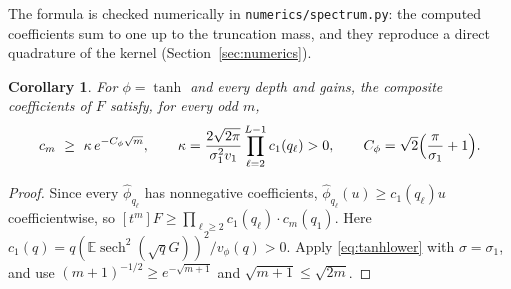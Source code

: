 \documentclass[11pt]{article}
\newtheorem{corollary}[theorem]{Corollary}
\theoremstyle{definition}\newtheorem{assumption}[theorem]{Assumption}
\theoremstyle{remark}\newtheorem{remark}[theorem]{Remark}
\newcommand{\E}{\mathbb E}
\begin{document}
The formula is checked numerically in \texttt{numerics/spectrum.py}: the
computed coefficients sum to one up to the truncation mass, and they
reproduce a direct quadrature of the kernel (Section~\ref{sec:numerics}).

\begin{corollary}\label{cor:composite}
For $\phi=\tanh$ and every depth and gains, the composite coefficients of
$F$ satisfy, for every odd $m$,
\[
 c_m\ \ge\ \kappa\,e^{-C_\phi\sqrt m},\qquad
 \kappa=\frac{2\sqrt{2\pi}}{\sigma_1^2v_1}\prod_{\ell=2}^{L-1}c_1(q_\ell)>0,
 \qquad C_\phi=\sqrt2\Bigl(\frac\pi{\sigma_1}+1\Bigr).
\]
\end{corollary}
\begin{proof}
Since every $\widehat\phi_{q_\ell}$ has nonnegative coefficients,
$\widehat\phi_{q_\ell}(u)\ge c_1(q_\ell)u$ coefficientwise, so
$[t^m]F\ge\prod_{\ell\ge2}c_1(q_\ell)\cdot c_m(q_1)$. Here
$c_1(q)=q(\E\operatorname{sech}^2(\sqrt qG))^2/v_\phi(q)>0$. Apply
\eqref{eq:tanhlower} with $\sigma=\sigma_1$, and use
$(m+1)^{-1/2}\ge e^{-\sqrt{m+1}}$ and $\sqrt{m+1}\le\sqrt{2m}$.
\end{proof}
\end{document}
